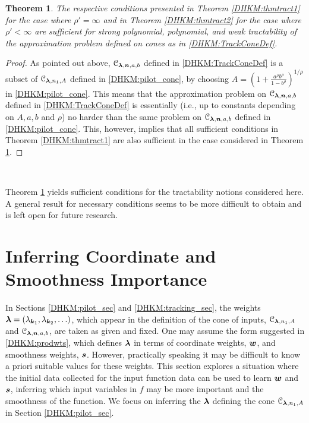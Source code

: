 \documentclass[USenglish]{article}
\theoremstyle{dgthm}
\newtheorem{theorem}{Theorem}
\theoremstyle{dgthm}
\theoremstyle{dgthm}
\theoremstyle{dgthm}
\theoremstyle{dgdef}
\theoremstyle{definition}
\begin{document}
\begin{theorem} \label{DHKM:thmtract3}
The respective conditions presented in Theorem \ref{DHKM:thmtract1} for the case where $\rho'=\infty$ and 
in Theorem \ref{DHKM:thmtract2} for the case where $\rho'<\infty$ are sufficient for strong polynomial, polynomial, and weak tractability of the approximation problem defined on cones as in \eqref{DHKM:TrackConeDef}.
\end{theorem}
\begin{proof}
As pointed out above, ${\mathcal{C}}_{\boldsymbol{\lambda},{\boldsymbol{n}},a,b}$ defined in \eqref{DHKM:TrackConeDef} is a subset of  ${\mathcal{C}}_{\boldsymbol{\lambda},n_1,A}$ defined in \eqref{DHKM:pilot_cone}, by choosing $A=\left(1 + \frac{a^\rho b^\rho}{1 - b^\rho} \right)^{1/\rho}$ in \eqref{DHKM:pilot_cone}. This means that the approximation problem on  ${\mathcal{C}}_{\boldsymbol{\lambda},{\boldsymbol{n}},a,b}$ defined in \eqref{DHKM:TrackConeDef} is essentially (i.e., up to constants depending on $A,a,b$ and $\rho$) no harder than the same problem on ${\mathcal{C}}_{\boldsymbol{\lambda},{\boldsymbol{n}},a,b}$ defined in \eqref{DHKM:pilot_cone}. This, however, implies that all sufficient conditions in Theorem \ref{DHKM:thmtract1} are also sufficient in the case considered in Theorem \ref{DHKM:thmtract3}.
\end{proof} \ 

Theorem \ref{DHKM:thmtract3} yields sufficient conditions for the tractability notions considered 
here. A general result for necessary conditions seems to be more difficult to obtain and is left open for future research.



\section{Inferring Coordinate and Smoothness Importance} \label{DHKM:smoothimportance_sec}

In Sections \ref{DHKM:pilot_sec} and \ref{DHKM:tracking_sec}, the weights ${\boldsymbol{\lambda}} = (\lambda_{{\boldsymbol{k}}_1}, \lambda_{{\boldsymbol{k}}_2}, \ldots )$, which appear in the definition of the cone of inputs, ${\mathcal{C}}_{{\boldsymbol{\lambda}},n_1,A}$ and ${\mathcal{C}}_{{\boldsymbol{\lambda}},{\boldsymbol{n}},a,b}$, are taken as given and fixed.  One may assume the form suggested in \eqref{DHKM:prodwts}, which defines ${\boldsymbol{\lambda}}$ in terms of coordinate weights, ${\boldsymbol{w}}$, and smoothness weights, ${\boldsymbol{s}}$.  However, practically speaking it may be difficult to know a priori suitable values for these weights.
This section explores a situation where the initial data collected for the input function data can be used to learn ${\boldsymbol{w}}$ and ${\boldsymbol{s}}$, inferring which input variables in $f$ may be more important and the smoothness of the function.  We focus on inferring the ${\boldsymbol{\lambda}}$ defining the cone ${\mathcal{C}}_{{\boldsymbol{\lambda}},n_1,A}$ in Section \ref{DHKM:pilot_sec}.  
\end{document}
